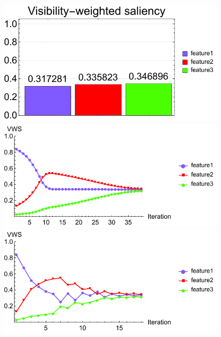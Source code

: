 \begin{figure}
\begin{minipage}{.25\textwidth}
		\subcaption{}
	\end{minipage}~
	\begin{minipage}{.25\textwidth}
		\includegraphics[width=1\linewidth]{figures/vortex_naive_optimized_fixed_visibility_saliency_weighted_chart}
		\subcaption{}
	\end{minipage}	
	
	\begin{minipage}{.49\textwidth}
		\includegraphics[width=1\linewidth]{figures/vortex_naive_proportional_saliency_fixed}
		\subcaption{}
	\end{minipage}
	\begin{minipage}{.49\textwidth}
		\includegraphics[width=1\linewidth]{figures/vortex_naive_proportional_saliency_parallelsearch}
		\subcaption{}
	\end{minipage}
	

\end{figure}
